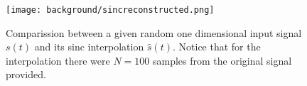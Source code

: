 \begin{figure}[ht]
  \centering
  \texttt{[image: background/sincreconstructed.png]}
  \caption{Comparission between a given random one dimensional input signal $s(t)$ and its sinc interpolation $\hat{s}(t)$. Notice that for the interpolation there were $N=100$ samples from the original signal provided.}
  \label{fig:plotsincinterpolation}  
\end{figure}
